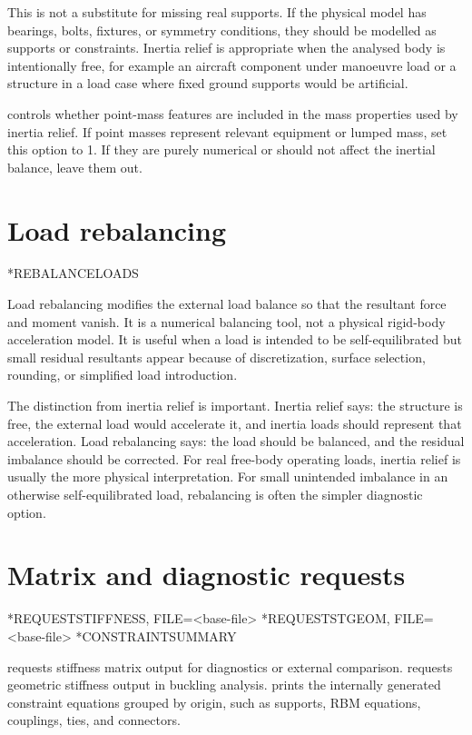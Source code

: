 This is not a substitute for missing real supports. If the physical model has bearings, bolts, fixtures, or symmetry conditions, they should be modelled as supports or constraints. Inertia relief is appropriate when the analysed body is intentionally free, for example an aircraft component under manoeuvre load or a structure in a load case where fixed ground supports would be artificial.

 controls whether point-mass features are included in the mass properties used by inertia relief. If point masses represent relevant equipment or lumped mass, set this option to 1. If they are purely numerical or should not affect the inertial balance, leave them out.

\section{Load rebalancing}

\begin{syntax}
*REBALANCELOADS
\end{syntax}

Load rebalancing modifies the external load balance so that the resultant force and moment vanish. It is a numerical balancing tool, not a physical rigid-body acceleration model. It is useful when a load is intended to be self-equilibrated but small residual resultants appear because of discretization, surface selection, rounding, or simplified load introduction.

The distinction from inertia relief is important. Inertia relief says: the structure is free, the external load would accelerate it, and inertia loads should represent that acceleration. Load rebalancing says: the load should be balanced, and the residual imbalance should be corrected. For real free-body operating loads, inertia relief is usually the more physical interpretation. For small unintended imbalance in an otherwise self-equilibrated load, rebalancing is often the simpler diagnostic option.

\section{Matrix and diagnostic requests}

\begin{syntax}
*REQUESTSTIFFNESS, FILE=<base-file>
*REQUESTSTGEOM, FILE=<base-file>
*CONSTRAINTSUMMARY
\end{syntax}

 requests stiffness matrix output for diagnostics or external comparison.  requests geometric stiffness output in buckling analysis.  prints the internally generated constraint equations grouped by origin, such as supports, RBM equations, couplings, ties, and connectors.


